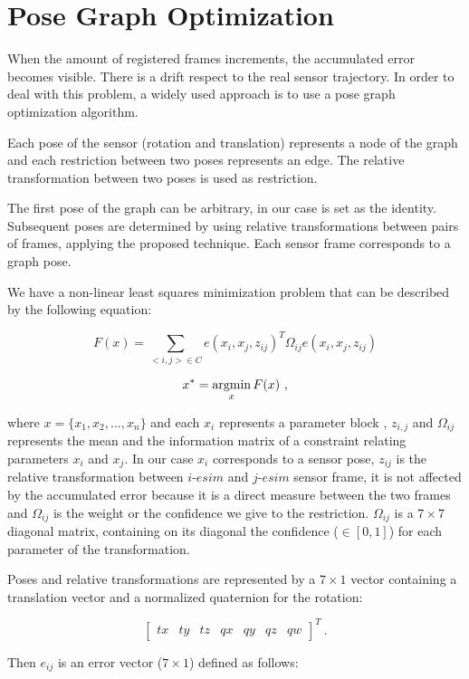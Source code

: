 \section{Pose Graph Optimization}
\label{sec:posegraph}
When the amount of registered frames increments, the accumulated error 
becomes visible. There is a drift respect to the real sensor trajectory. 
In order to deal with this problem, a widely used approach is to use a pose graph 
optimization algorithm. 


Each pose of the sensor (rotation and translation) represents a node of the 
graph and each restriction between two poses represents an edge. The relative 
transformation between two poses is used as restriction.


The first pose of the graph can be arbitrary, in our case is set as the identity. Subsequent 
poses are determined by using relative transformations between pairs of frames, applying the
proposed technique. Each sensor frame corresponds to a graph pose. 

We have a non-linear least squares minimization problem that can be described by the following equation:

$$ F(x) = \sum\limits_{<i,j> \in C } e(x_i,x_j,z_{ij})^T \Omega_{ij} e(x_i,x_j,z_{ij}) $$

$$ x^* = \mathop{\rm argmin}_x F(x) \ ,$$

\noindent where $x=\{x_1,x_2,...,x_n\}$ and each $x_i$ represents a parameter block , $z_{i,j}$ and $\Omega_{ij}$ represents the mean  
 and the information matrix  of a constraint 
relating parameters $x_i$ and $x_j$. In our case $x_i$ corresponds to a sensor pose, $z_{ij}$ is the 
relative transformation between $i$-$esim$ and $j$-$esim$ sensor frame, it is not affected by the accumulated error 
because it is a direct measure between the two frames and $\Omega_{ij}$ is the weight or 
the confidence we give to the restriction. $\Omega_{ij}$ is a $7\times7$ diagonal matrix, containing on its diagonal the confidence ($\in [0,1]$) for each 
parameter of the transformation. 

Poses and relative transformations are represented by a $7\times1$ vector containing a translation vector
 and a normalized quaternion for the rotation:

$$ \begin{bmatrix} tx & ty & tz & qx & qy & qz & qw \end{bmatrix} ^T \ .$$



Then $e_{ij}$ is an error vector ($7\times1$) defined as follows:


